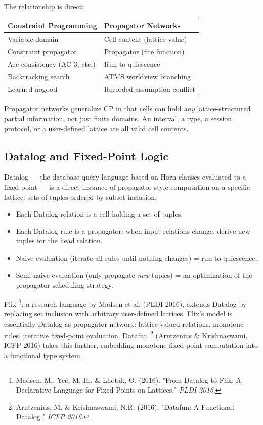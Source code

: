 \documentclass[11pt]{article}
\begin{document}
The relationship is direct:

\begin{center}
\begin{tabular}{ll}
Constraint Programming & Propagator Networks\\
\hline
Variable domain & Cell content (lattice value)\\
Constraint propagator & Propagator (fire function)\\
Arc consistency (AC-3, etc.) & Run to quiescence\\
Backtracking search & ATMS worldview branching\\
Learned nogood & Recorded assumption conflict\\
\end{tabular}
\end{center}

Propagator networks generalize CP in that cells can hold \emph{any}
lattice-structured partial information, not just finite domains. An
interval, a type, a session protocol, or a user-defined lattice are all
valid cell contents.
\subsection{Datalog and Fixed-Point Logic}
\label{sec:orgfcd42f3}

Datalog --- the database query language based on Horn clauses evaluated
to a fixed point --- is a direct instance of propagator-style
computation on a specific lattice: sets of tuples ordered by subset
inclusion.

\begin{itemize}
\item Each Datalog relation is a cell holding a set of tuples.
\item Each Datalog rule is a propagator: when input relations change,
derive new tuples for the head relation.
\item Naive evaluation (iterate all rules until nothing changes) =
run to quiescence.
\item Semi-naive evaluation (only propagate \emph{new} tuples) = an optimization
of the propagator scheduling strategy.
\end{itemize}

Flix \footnote{Madsen, M., Yee, M.-H., \& Lhotak, O. (2016). "From Datalog
to Flix: A Declarative Language for Fixed Points on Lattices." \emph{PLDI 2016}.}, a research language by Madsen et al. (PLDI 2016),
extends Datalog by replacing set inclusion with arbitrary user-defined
lattices. Flix's model is essentially Datalog-as-propagator-network:
lattice-valued relations, monotone rules, iterative fixed-point
evaluation. Datafun \footnote{Arntzenius, M. \& Krishnaswami, N.R. (2016). "Datafun: A
Functional Datalog." \emph{ICFP 2016}.} (Arntzenius \& Krishnaswami, ICFP 2016)
takes this further, embedding monotone fixed-point computation into a
functional type system.
\end{document}

